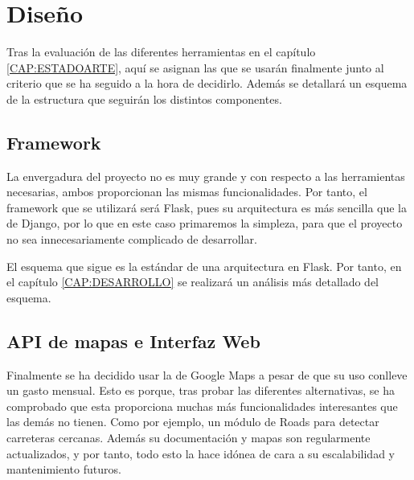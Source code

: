   

\section{Diseño\label{SEC:DISENO}}
  Tras la evaluación de las diferentes herramientas en el capítulo \ref{CAP:ESTADOARTE}, aquí se asignan las que se usarán finalmente junto al criterio que se ha seguido a la hora de decidirlo. Además se detallará un esquema de la estructura que seguirán los distintos componentes.
  
  
  \subsection{Framework}
    La envergadura del proyecto no es muy grande y con respecto a las herramientas necesarias, ambos proporcionan las mismas funcionalidades. Por tanto, el framework que se utilizará será Flask, pues su arquitectura es más sencilla que la de Django, por lo que en este caso primaremos la simpleza, para que el proyecto no sea innecesariamente complicado de desarrollar.
    
    El esquema que sigue es la estándar de una arquitectura  en Flask. Por tanto, en el capítulo \ref{CAP:DESARROLLO} se realizará un análisis más detallado del esquema.

  \subsection{API de mapas e Interfaz Web}
    Finalmente se ha decidido usar la  de Google Maps\cite{gmaps} a pesar de que su uso conlleve un gasto mensual. Esto es porque, tras probar las diferentes alternativas, se ha comprobado que esta  proporciona muchas más funcionalidades interesantes que las demás no tienen. Como por ejemplo, un módulo de Roads para detectar carreteras cercanas.
    Además su documentación y mapas son regularmente actualizados, y por tanto, todo esto la hace idónea de cara a su escalabilidad y mantenimiento futuros.

